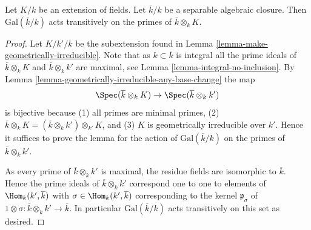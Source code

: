 \begin{lemma}
\label{lemma-Galois-orbit}
Let $K/k$ be an extension of fields.
Let $\overline{k}/k$ be a separable algebraic closure.
Then $\text{Gal}(\overline{k}/k)$ acts transitively on the
primes of $\overline{k} \otimes_k K$.
\end{lemma}

\begin{proof}
Let $K/k'/k$ be the subextension found in
Lemma \ref{lemma-make-geometrically-irreducible}.
Note that as $k \subset \overline{k}$ is integral all the prime ideals
of $\overline{k} \otimes_k K$ and $\overline{k} \otimes_k k'$ are maximal, see
Lemma \ref{lemma-integral-no-inclusion}.
By Lemma \ref{lemma-geometrically-irreducible-any-base-change}
the map
$$
\Spec(\overline{k} \otimes_k K) \to \Spec(\overline{k} \otimes_k k')
$$
is bijective because (1) all primes are minimal primes, (2)
$\overline{k} \otimes_k K = (\overline{k} \otimes_k k') \otimes_{k'} K$,
and (3) $K$ is geometrically irreducible over $k'$.
Hence it suffices to prove the lemma for the action of
$\text{Gal}(\overline{k}/k)$ on the primes of $\overline{k} \otimes_k k'$.

\medskip\noindent
As every prime of $\overline{k} \otimes_k k'$ is maximal, the residue fields
are isomorphic to $\overline{k}$. Hence the prime ideals of
$\overline{k} \otimes_k k'$ correspond one to one to elements of
$\Hom_k(k', \overline{k})$ with $\sigma \in \Hom_k(k', \overline{k})$
corresponding to the kernel $\mathfrak p_\sigma$ of
$1 \otimes \sigma : \overline{k} \otimes_k k' \to \overline{k}$.
In particular $\text{Gal}(\overline{k}/k)$ acts transitively on
this set as desired.
\end{proof}